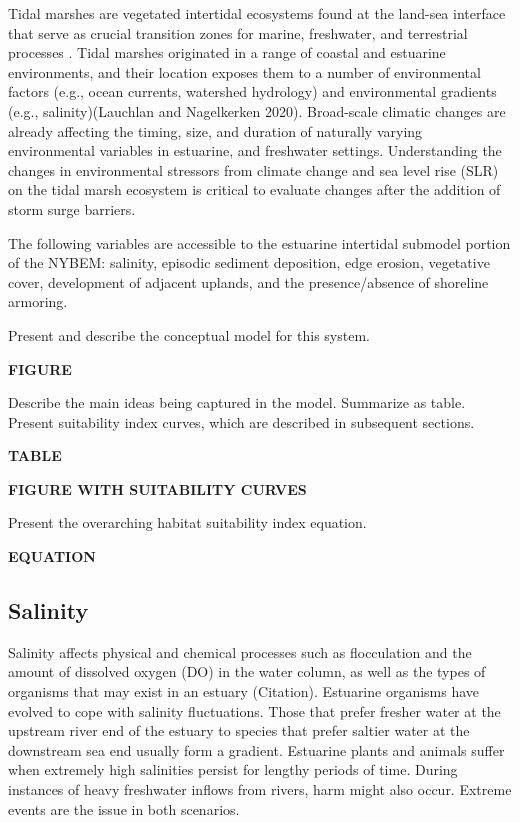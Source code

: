 \documentclass[
]{book}
\begin{document}
Tidal marshes are vegetated intertidal ecosystems found at the land-sea interface that serve as crucial transition zones for marine, freshwater, and terrestrial processes \citep{colombano_climate_2021}. Tidal marshes originated in a range of coastal and estuarine environments, and their location exposes them to a number of environmental factors (e.g., ocean currents, watershed hydrology) and environmental gradients (e.g., salinity)(Lauchlan and Nagelkerken 2020). Broad-scale climatic changes are already affecting the timing, size, and duration of naturally varying environmental variables in estuarine, and freshwater settings. Understanding the changes in environmental stressors from climate change and sea level rise (SLR) on the tidal marsh ecosystem is critical to evaluate changes after the addition of storm surge barriers.

The following variables are accessible to the estuarine intertidal submodel portion of the NYBEM: salinity, episodic sediment deposition, edge erosion, vegetative cover, development of adjacent uplands, and the presence/absence of shoreline armoring.

Present and describe the conceptual model for this system.

\textbf{FIGURE}

Describe the main ideas being captured in the model. Summarize as table. Present suitability index curves, which are described in subsequent sections.

\textbf{TABLE}

\textbf{FIGURE WITH SUITABILITY CURVES}

Present the overarching habitat suitability index equation.

\textbf{EQUATION}

\hypertarget{salinity}{%
\subsection{Salinity}\label{salinity}}

Salinity affects physical and chemical processes such as flocculation and the amount of dissolved oxygen (DO) in the water column, as well as the types of organisms that may exist in an estuary (Citation). Estuarine organisms have evolved to cope with salinity fluctuations. Those that prefer fresher water at the upstream river end of the estuary to species that prefer saltier water at the downstream sea end usually form a gradient. Estuarine plants and animals suffer when extremely high salinities persist for lengthy periods of time. During instances of heavy freshwater inflows from rivers, harm might also occur. Extreme events are the issue in both scenarios.
\end{document}

